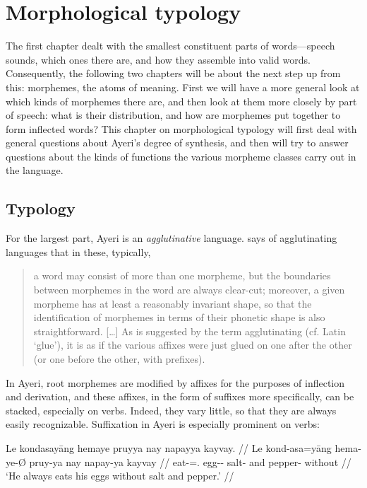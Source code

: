 
\chapter{Morphological typology}

The first chapter dealt with the smallest constituent parts of words---speech 
sounds, which ones there are, and how they assemble into valid words. 
Consequently, the following two chapters will be about the next step up from 
this: morphemes, the atoms of meaning. First we will have a more general look 
at which kinds of morphemes there are, and then look at them more closely by 
part of speech: what is their distribution, and how are morphemes put together 
to form inflected words? This chapter on morphological typology will first deal 
with general questions about Ayeri's degree of synthesis, and then will try 
to answer questions about the kinds of functions the various morpheme classes 
carry out in the language.

\section{Typology}
\label{sec:typology}

For the largest part, Ayeri is an \emph{agglutinative} 
language. \citet{comrie1989} says of agglutinating languages that in these, 
typically,

\blockcquote[43--44]{comrie1989}{a word may consist of more than one morpheme, 
but the boundaries between morphemes in the word are always clear-cut; moreover, 
a given morpheme has at least a reasonably invariant shape, so that the 
identification of morphemes in terms of their phonetic shape is also 
straightforward. […] As is suggested by the term agglutinating (cf. Latin 
 `glue'), it is as if the various affixes were just glued on one 
after the other (or one before the other, with prefixes).}

In Ayeri, root morphemes are modified by affixes for the purposes of inflection 
and derivation, and these affixes, in the form of suffixes more 
specifically, can be stacked, especially on verbs. Indeed, they vary little, so 
that they are always easily recognizable. Suffixation in Ayeri is especially 
prominent on verbs:

\ex\begingl
	\gla Le kondasayāng hemaye pruyya nay napayya kayvay. //
	\glb Le kond-asa=yāng hema-ye-Ø pruy-ya nay napay-ya kayvay //
	\glc \PatTI{} eat-\Hab{}=\TsgM{}.\Aarg{} egg-\Pl{}-\Top{} salt-\Loc{} 
		and pepper-\Loc{} without //
	\glft `He always eats his eggs without salt and pepper.' //
\endgl\xe

